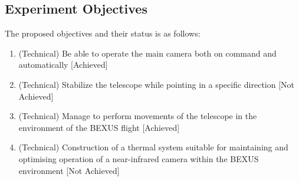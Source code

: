 \subsection{Experiment Objectives}


The proposed objectives and their status is as follows:
\renewcommand{\labelenumi}{\Roman{enumi}}
\begin{enumerate}
    \item (Technical) Be able to operate the main camera both on command and automatically [Achieved]
    \item (Technical) Stabilize the telescope while pointing in a specific direction [Not Achieved]
    \item (Technical) Manage to perform movements of the telescope in the environment of the BEXUS flight [Achieved]
    \item (Technical) Construction of a thermal system suitable for maintaining and optimising operation of a near-infrared camera within the BEXUS environment [Not Achieved]
\end{enumerate}
